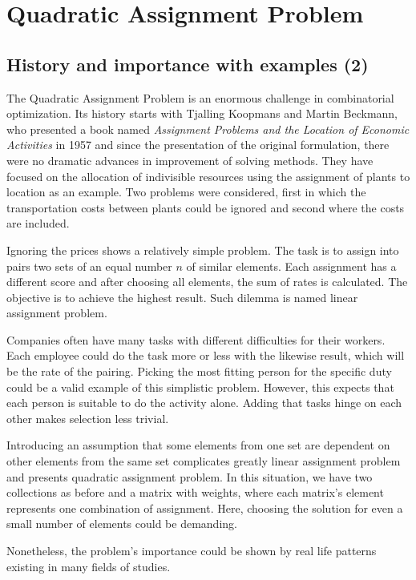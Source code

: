\section{Quadratic Assignment Problem}
\label{section:background_qap}

\subsection{History and importance with examples (2)}
The Quadratic Assignment Problem is an enormous challenge in combinatorial optimization.
Its history starts with Tjalling Koopmans and Martin Beckmann, who presented a book named \textit{Assignment Problems and the Location of Economic Activities} in 1957 \cite{koopmans-beckmann1957} and since the presentation of the original formulation, there were no dramatic advances in improvement of solving methods.
They have focused on the allocation of indivisible resources using the assignment of plants to location as an example.
Two problems were considered, first in which the transportation costs between plants could be ignored and second where the costs are included.

Ignoring the prices shows a relatively simple problem.
The task is to assign into pairs two sets of an equal number $n$ of similar elements.
Each assignment has a different score and after choosing all elements, the sum of rates is calculated.
The objective is to achieve the highest result.
Such dilemma is named linear assignment problem.

Companies often have many tasks with different difficulties for their workers.
Each employee could do the task more or less with the likewise result, which will be the rate of the pairing.
Picking the most fitting person for the specific duty could be a valid example of this simplistic problem.
However, this expects that each person is suitable to do the activity alone.
Adding that tasks hinge on each other makes selection less trivial.

Introducing an assumption that some elements from one set are dependent on other elements from the same set complicates greatly linear assignment problem and presents quadratic assignment problem.
In this situation, we have two collections as before and a matrix with weights, where each matrix's element represents one combination of assignment.
Here, choosing the solution for even a small number of elements could be demanding.

Nonetheless, the problem's importance could be shown by real life patterns existing in many fields of studies.

